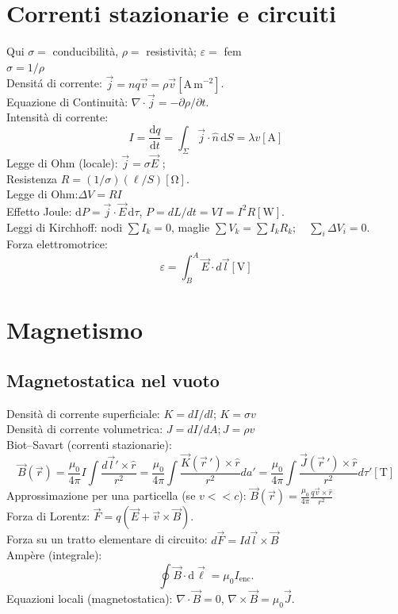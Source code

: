 \documentclass{book}
\begin{document}
\section*{Correnti stazionarie e circuiti}
Qui $\sigma =$ conducibilità, $\rho=$ resistività; $\varepsilon =$ fem \\
$\sigma = 1/\rho$\\
Densit\'a di corrente: $\vec{j}=n q \vec{v}=\rho \vec{v} \left[ \mathrm{A\,m^{-2}} \right]$.\\
Equazione di Continuit\`a: $\nabla\cdot\vec{j}=-\partial\rho/\partial t$.\\
Intensit\`a di corrente: 
\[
I=\frac{\mathrm{d}q}{\mathrm{d}t} =\int_{\Sigma}\vec{j}\cdot\hat{n}\,\mathrm{d}S = \lambda v
 \left[ \mathrm{A} \right]\]
Legge di Ohm (locale): $\vec{j}=\sigma\vec{E}$ ;\\ Resistenza $R=(1/\sigma)(\ell/S) \left[\mathrm{\Omega} \right]$.\\
Legge di Ohm:$\Delta V=RI$\\
Effetto Joule: $\mathrm{d}P=\vec{j}\cdot\vec{E}\,\mathrm{d}\tau$, \; $P=dL/dt=VI=I^2 R \left[ \mathrm{W} \right]$.\\
Leggi di Kirchhoff: nodi $\sum I_k=0$, maglie $\sum V_k=\sum I_k R_k; \quad \sum_i \Delta V_i =0$.\\
Forza elettromotrice: $$\varepsilon = \int_B^A \vec{E}\cdot d\vec{l} \left[ \mathrm{V} \right]$$

\section*{Magnetismo}

\subsection*{Magnetostatica nel vuoto}
Densità di corrente superficiale: $K=dI/dl$; $K=\sigma v$\\
Densità di corrente volumetrica: $J=dI/dA; J=\rho v$\\
Biot--Savart (correnti stazionarie):
\[\vec B(\vec r) = \frac{\mu_0}{4\pi}I\int\frac{d\vec l'\times\hat r}{r^2} = \frac{\mu_0}{4\pi}\int\frac{\vec K(\vec r\,')\times\hat r}{r^2} da' = \frac{\mu_0}{4\pi}\int\frac{\vec J(\vec r\,')\times\hat r}{r^2} d\tau' \left[ \mathrm{T} \right]\]
Approssimazione per una particella (se $v<<c$):
$ \vec{B}(\vec{r})= \frac{\mu_0}{4 \pi} \frac{q \vec{v}\times \hat{r}}{r^2}$\\ 
Forza di Lorentz: $\vec{F}=q(\vec{E}+\vec{v}\times\vec{B})$.\\
Forza su un tratto elementare di circuito: $d\vec{F}=Id\vec{l}\times \vec{B}$\\
Amp\`ere (integrale): 
\[ 
\oint \vec{B}\cdot\mathrm{d}\vec{\ell}=\mu_0 I_{\mathrm{enc}}.
\]
Equazioni locali (magnetostatica): $\nabla\cdot\vec{B}=0$, \; $\nabla\times\vec{B}=\mu_0\vec{J}$.
\end{document}
